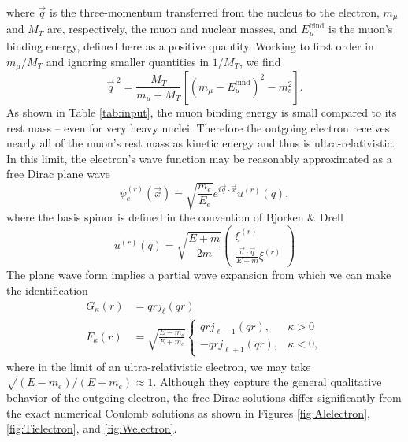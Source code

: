 \documentclass{book}[12pt]
\begin{document}
where $\vec{q}$ is the three-momentum transferred from the nucleus to the electron, $m_{\mu}$ and $M_T$ are, respectively, the muon and nuclear masses, and $E_{\mu}^\mathrm{bind}$ is the muon's binding energy, defined here as a positive quantity. Working to first order in $m_{\mu}/M_T$ and ignoring smaller quantities in $1/M_T$, we find
\begin{equation}
\vec{q}^{\;2}=\frac{M_T}{m_{\mu}+M_T}\left[\left(m_{\mu}-E_{\mu}^\mathrm{bind}\right)^2-m_e^2\right].
\end{equation}
As shown in Table \ref{tab:input}, the muon binding energy is small compared to its rest mass -- even for very heavy nuclei. Therefore the outgoing electron receives nearly all of the muon's rest mass as kinetic energy and thus is ultra-relativistic. In this limit, the electron's wave function may be reasonably approximated as a free Dirac plane wave
\begin{equation}
\psi_e^{(r)}(\vec{x})=\sqrt{\frac{m_e}{E_e}}e^{i\vec{q}\cdot\vec{x}}u^{(r)}(q),
\end{equation}
where the basis spinor is defined in the convention of Bjorken \& Drell
\begin{equation}
u^{(r)}(q)=\sqrt{\frac{E+m}{2m}}\left(\begin{array}{c}
\xi^{(r)}\\
\frac{\vec{\sigma}\cdot\vec{q}}{E+m}\xi^{(r)}
\end{array}\right)
\end{equation}
The plane wave form implies a partial wave expansion from which we can make the identification
\begin{equation}
\begin{split}
G_{\kappa}(r)&=qrj_{\ell}(qr)\\
F_{\kappa}(r)&=\sqrt{\frac{E-m_e}{E+m_e}}\left\{\begin{array}{cc}
qrj_{\ell-1}(qr), & \kappa>0\\
-qrj_{\ell+1}(qr), &\kappa < 0,
\end{array}\right.
\end{split}
\end{equation}
where in the limit of an ultra-relativistic electron, we may take $\sqrt{(E-m_e)/(E+m_e)}\approx 1$. Although they capture the general qualitative behavior of the outgoing electron, the free Dirac solutions differ significantly from the exact numerical Coulomb solutions as shown in Figures \ref{fig:Alelectron}, \ref{fig:Tielectron}, and \ref{fig:Welectron}.
\end{document}
